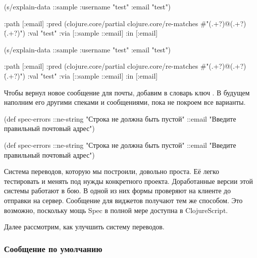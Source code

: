 \ifnarrow


\begin{clojure}
(s/explain-data ::sample
  {:username "test" :email "test"})

{:path [:email]
 :pred
 (clojure.core/partial
  clojure.core/re-matches
  #"(.+?)@(.+?)\.(.+?)")
 :val "test"
 :via [::sample ::email]
 :in [:email]}
\end{clojure}


\else


\begin{clojure}
(s/explain-data ::sample {:username "test" :email "test"})

{:path [:email]
 :pred
 (clojure.core/partial
  clojure.core/re-matches
  #"(.+?)@(.+?)\.(.+?)")
 :val "test"
 :via [::sample ::email]
 :in [:email]}
\end{clojure}


\fi

Чтобы  вернул новое сообщение для почты, добавим в словарь
ключ . В будущем наполним его другими спеками и сообщениями, пока
не покроем все варианты.

\ifnarrow

\begin{clojure}
(def spec-errors
  {::ne-string
   "Строка не должна быть пустой"
   ::email
   "Введите правильный почтовый адрес"})
\end{clojure}

\else

\begin{clojure}
(def spec-errors
  {::ne-string "Строка не должна быть пустой"
   ::email "Введите правильный почтовый адрес"})
\end{clojure}

\fi


Система переводов, которую мы построили, довольно проста. Её легко тестировать и
менять под нужды конкретного проекта. Доработанные версии этой системы работают
в бою. В одной из них формы проверяют на клиенте до отправки на
сервер. Сообщение для виджетов получают тем же способом. Это возможно, поскольку
мощь Spec в полной мере доступна в ClojureScript.

Далее рассмотрим, как улучшить систему переводов.

\subsubsection*{Сообщение по умолчанию}


